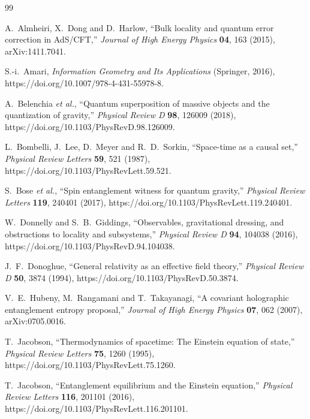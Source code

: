\documentclass[11pt,a4paper]{article}
\theoremstyle{remark}
\begin{document}
\begin{thebibliography}{99}
\raggedright
{}
A.~Almheiri, X.~Dong and D.~Harlow, ``Bulk locality and quantum error correction
in AdS/CFT,'' \emph{Journal of High Energy Physics} \textbf{04}, 163 (2015),
arXiv:1411.7041.

S.-i.~Amari, \emph{Information Geometry and Its Applications} (Springer, 2016),
https://doi.org/10.1007/978-4-431-55978-8.

A.~Belenchia \emph{et al.}, ``Quantum superposition of massive objects and the
quantization of gravity,'' \emph{Physical Review D} \textbf{98}, 126009 (2018),
https://doi.org/10.1103/PhysRevD.98.126009.

L.~Bombelli, J.~Lee, D.~Meyer and R.~D.~Sorkin, ``Space-time as a causal set,''
\emph{Physical Review Letters} \textbf{59}, 521 (1987),
https://doi.org/10.1103/PhysRevLett.59.521.

S.~Bose \emph{et al.}, ``Spin entanglement witness for quantum gravity,''
\emph{Physical Review Letters} \textbf{119}, 240401 (2017),
https://doi.org/10.1103/PhysRevLett.119.240401.

W.~Donnelly and S.~B.~Giddings, ``Observables, gravitational dressing, and
obstructions to locality and subsystems,'' \emph{Physical Review D} \textbf{94},
104038 (2016), https://doi.org/10.1103/PhysRevD.94.104038.

J.~F.~Donoghue, ``General relativity as an effective field theory,''
\emph{Physical Review D} \textbf{50}, 3874 (1994),
https://doi.org/10.1103/PhysRevD.50.3874.

V.~E.~Hubeny, M.~Rangamani and T.~Takayanagi, ``A covariant holographic
entanglement entropy proposal,'' \emph{Journal of High Energy Physics}
\textbf{07}, 062 (2007), arXiv:0705.0016.

T.~Jacobson, ``Thermodynamics of spacetime: The Einstein equation of state,''
\emph{Physical Review Letters} \textbf{75}, 1260 (1995),
https://doi.org/10.1103/PhysRevLett.75.1260.

T.~Jacobson, ``Entanglement equilibrium and the Einstein equation,''
\emph{Physical Review Letters} \textbf{116}, 201101 (2016),
https://doi.org/10.1103/PhysRevLett.116.201101.


\end{thebibliography}
\end{document}

